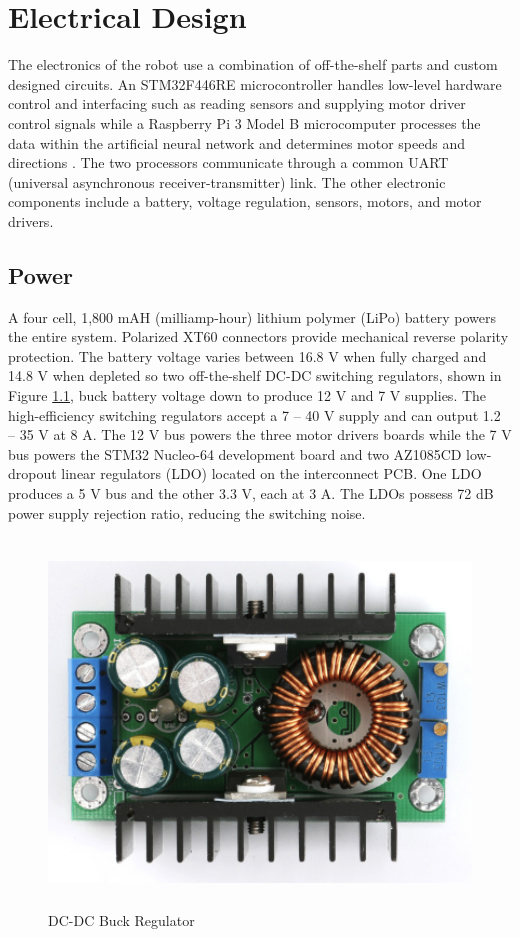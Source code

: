 \chapter{Electrical Design}
The electronics of the robot use a combination of off-the-shelf parts and custom designed circuits. An STM32F446RE microcontroller handles low-level hardware control and interfacing such as reading sensors and supplying motor driver control signals while a Raspberry Pi 3 Model B microcomputer processes the data within the artificial neural network and determines motor speeds and directions \cite{stm32f446re}\cite{raspberrypi}. The two processors communicate through a common UART (universal asynchronous receiver-transmitter) link. The other electronic components include a battery, voltage regulation, sensors, motors, and motor drivers.

\section{Power}
A four cell, 1,800 mAH (milliamp-hour) lithium polymer (LiPo) battery powers the entire system. Polarized XT60 connectors provide mechanical reverse polarity protection. The battery voltage varies between 16.8 V when fully charged and 14.8 V when depleted so two off-the-shelf DC-DC switching regulators, shown in Figure \ref{fig:smps}, buck battery voltage down to produce 12 V and 7 V supplies. The high-efficiency switching regulators accept a 7 -- 40 V supply and can output 1.2 -- 35 V at 8 A. The 12 V bus powers the three motor drivers boards while the 7 V bus powers the STM32 Nucleo-64 development board and two AZ1085CD low-dropout linear regulators (LDO) located on the interconnect PCB. One LDO produces a 5 V bus and the other 3.3 V, each at 3 A. The LDOs possess 72 dB power supply rejection ratio, reducing the switching noise. 
\begin{figure}[H]   %
	\centering \includegraphics[width=6in, height=3.85in, keepaspectratio]{figures/smps.png}
	\caption{DC-DC Buck Regulator \cite{smps}}\label{fig:smps}
\end{figure}

